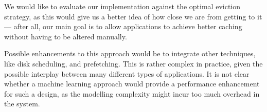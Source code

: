 We would like to evaluate our implementation against the optimal eviction
strategy, as this would give us a better idea of how close we are from getting
to it --- after all, our main goal is to allow applications to achieve better
caching without having to be altered manually.

Possible enhancements to this approach would be to integrate other techniques,
like disk scheduling, and prefetching.  This is rather complex in practice,
given the possible interplay between many different types of applications.  It
is not clear whether a machine learning approach would provide a performance
enhancement for such a design, as the modelling complexity might incur too much
overhead in the system.
